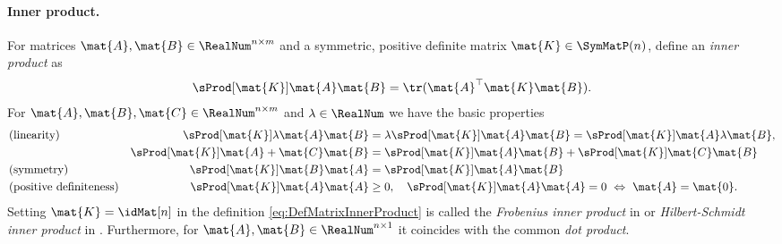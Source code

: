 \paragraph{Inner product.}
For matrices $\mat{A}, \mat{B} \in \RealNum^{n\times m}$ and a symmetric, positive definite matrix $ \mat{K} \in \SymMatP(n)$, define an \textit{inner product} as
\begin{align}\label{eq:DefMatrixInnerProduct}
 \sProd[\mat{K}]{\mat{A}}{\mat{B}} = \tr(\mat{A}^\top \mat{K} \mat{B}).
\end{align}
For $\mat{A}, \mat{B}, \mat{C} \in \RealNum^{n\times m}$ and $\lambda \in \RealNum$ we have the basic properties
\begin{subequations}
\begin{align}
 &\text{(linearity)}&
 \sProd[\mat{K}]{\lambda \mat{A}}{\mat{B}} &= \lambda \sProd[\mat{K}]{\mat{A}}{\mat{B}} = \sProd[\mat{K}]{\mat{A}}{\lambda \mat{B}},
\\
 &&
 \sProd[\mat{K}]{\mat{A}+\mat{C}}{\mat{B}} &= \sProd[\mat{K}]{\mat{A}}{\mat{B}} + \sProd[\mat{K}]{\mat{C}}{\mat{B}}
\\
 &\text{(symmetry)}&
 \sProd[\mat{K}]{\mat{B}}{\mat{A}} %
 &= \sProd[\mat{K}]{\mat{A}}{\mat{B}}
\\
 &\text{(positive definiteness)}&
 \sProd[\mat{K}]{\mat{A}}{\mat{A}} &\geq 0, \quad \sProd[\mat{K}]{\mat{A}}{\mat{A}} = 0 \ \Leftrightarrow \ \mat{A} = \mat{0}.
\end{align}
\end{subequations}
Setting $\mat{K} = \idMat[n]$ in the definition \eqref{eq:DefMatrixInnerProduct} is called the \textit{Frobenius inner product} in \cite[sec.\ 5.2]{Horn:MatrixAnalysis} or \textit{Hilbert-Schmidt inner product} in \cite[sec.\ A.6]{Hall:LieGroups}.
Furthermore, for $\mat{A}, \mat{B} \in \RealNum^{n\times 1}$ it coincides with the common \textit{dot product}.

